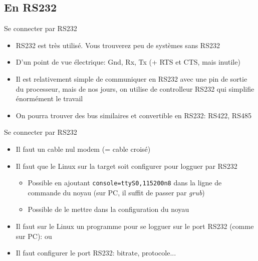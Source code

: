 \subsection{En RS232}

\begin{frame}{Se connecter par RS232}
  \begin{itemize}
  \item RS232  est très utilisé.  Vous trouverez peu de  systèmes sans
    RS232
  \item D'un point de vue électrique:  Gnd, Rx, Tx (+ RTS et CTS, mais
    inutile)
  \item Il  est relativement simple  de communiquer en RS232  avec une
    pin  de sortie du  processeur, mais  de nos  jours, on  utilise de
    controlleur RS232 qui simplifie énormément le travail
  \item On pourra trouver des  bus similaires et convertible en RS232:
    RS422, RS485
  \end{itemize}
\end{frame}

\begin{frame}{Se connecter par RS232}
  \begin{itemize}
  \item Il faut un cable nul modem (= cable croisé)
  \item  Il faut  que  le Linux  sur  la target  soit configurer  pour
    logguer par RS232
    \begin{itemize}
    \item Possible en ajoutant \texttt{console=ttyS0,115200n8} dans la
      ligne  de commande du  noyau (sur  PC, il  suffit de  passer par
      \emph{grub}) 
    \item Possible de le mettre dans la configuration du noyau
    \end{itemize}
  \item Il faut sur le Linux  un programme pour se logguer sur le port
    RS232 (comme sur PC):  ou 
  \item Il faut configurer le port RS232: bitrate, protocole...
  \end{itemize}
\end{frame}


